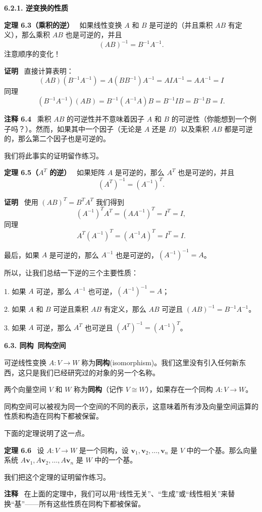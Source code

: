 \textbf{6.2.1. 逆变换的性质}

\textbf{定理 6.3（乘积的逆）}~ 如果线性变换 $A$ 和 $B$ 是可逆的（并且乘积 $AB$ 有定义），那么乘积 $AB$ 也是可逆的，并且 $$(AB)^{-1} = B^{-1} A^{-1}.$$
注意顺序的变化！

\textbf{证明}~ 直接计算表明：$$(AB)(B^{-1} A^{-1}) = A(BB^{-1})A^{-1} = AIA^{-1} = AA^{-1} = I$$
同理
$$(B^{-1} A^{-1})(AB) = B^{-1}(A^{-1} A)B = B^{-1}IB = B^{-1}B = I.$$

\textbf{注释 6.4} ~乘积 $AB$ 的可逆性并不意味着因子 $A$ 和 $B$ 的可逆性（你能想到一个例子吗？）。然而，如果其中一个因子（无论是 $A$ 还是 $B$）以及乘积 $AB$ 都是可逆的，那么第二个因子也是可逆的。

我们将此事实的证明留作练习。

\textbf{定理 6.5（$A^T$ 的逆）}~ 如果矩阵 $A$ 是可逆的，那么 $A^T$ 也是可逆的，并且 $$(A^T)^{-1} = (A^{-1})^T.$$

\textbf{证明}~ 使用 $(AB)^T = B^T A^T$ 我们得到 $$(A^{-1})^T A^T = (AA^{-1})^T = I^T = I,$$
同理 
$$A^T (A^{-1})^T = (A^{-1} A)^T = I^T = I.$$

最后，如果 $A$ 是可逆的，那么 $A^{-1}$ 也是可逆的，$(A^{-1})^{-1} = A$。

所以，让我们总结一下逆的三个主要性质：

1. 如果 $A$ 可逆，那么 $A^{-1}$ 也可逆，$(A^{-1})^{-1} = A$；

2. 如果 $A$ 和 $B$ 可逆且乘积 $AB$ 有定义，那么 $AB$ 可逆且 $(AB)^{-1} = B^{-1} A^{-1}$。

3. 如果 $A$ 可逆，那么 $A^T$ 也可逆且 $(A^T)^{-1} = (A^{-1})^T$。

\textbf{6.3. 同构~同构空间}

可逆线性变换 $A: V \to W$ 称为\textbf{同构}(isomorphism)。我们这里没有引入任何新东西，这只是我们已经研究过的对象的另一个名称。

两个向量空间 $V$ 和 $W$ 称为\textbf{同构}（记作 $V \cong W$），如果存在一个同构 $A: V \to W$。

同构空间可以被视为同一个空间的不同的表示，这意味着所有涉及向量空间运算的性质和构造在同构下都被保留。

下面的定理说明了这一点。

\textbf{定理 6.6} ~设 $A: V \to W$ 是一个同构，设 $\mathbf{v}_1, \mathbf{v}_2, \dots, \mathbf{v}_n$ 是 $V$ 中的一个基。那么向量系统 $A \mathbf{v}_1, A \mathbf{v}_2, \dots, A \mathbf{v}_n$ 是 $W$ 中的一个基。

我们把这个定理的证明留作练习。

\textbf{注释}~ 在上面的定理中，我们可以用“线性无关”、“生成”或“线性相关”来替换“基”——所有这些性质在同构下都被保留。

